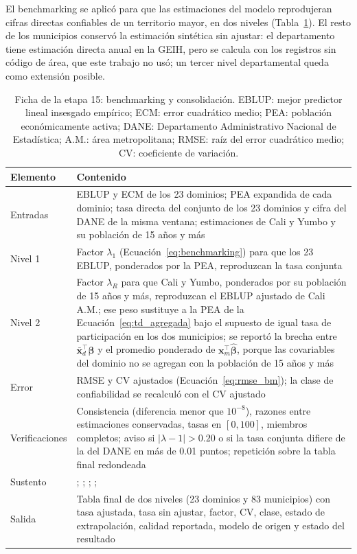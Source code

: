 El benchmarking se aplicó para que las estimaciones del modelo reprodujeran cifras directas confiables de un territorio mayor, en dos niveles (Tabla~\ref{tab:met_benchmarking}). El resto de los municipios conservó la estimación sintética sin ajustar: el departamento tiene estimación directa anual en la GEIH, pero se calcula con los registros sin código de área, que este trabajo no usó; un tercer nivel departamental queda como extensión posible.

\begin{table}[!htbp]
\centering
\small
\caption[Ficha de la etapa 15: benchmarking y consolidación]{Ficha de la etapa 15: benchmarking y consolidación. EBLUP: mejor predictor lineal insesgado empírico; ECM: error cuadrático medio; PEA: población económicamente activa; DANE: Departamento Administrativo Nacional de Estadística; A.M.: área metropolitana; RMSE: raíz del error cuadrático medio; CV: coeficiente de variación.}
\label{tab:met_benchmarking}
\renewcommand{\arraystretch}{1.15}
\begin{tabularx}{\linewidth}{>{\raggedright\arraybackslash}p{2.8cm} >{\raggedright\arraybackslash}X}
\toprule
Elemento & Contenido \\
\midrule
Entradas & EBLUP y ECM de los 23 dominios; PEA expandida de cada dominio; tasa directa del conjunto de los 23 dominios y cifra del DANE de la misma ventana; estimaciones de Cali y Yumbo y su población de 15 años y más \\
Nivel 1 & Factor $\lambda_1$ (Ecuación~\ref{eq:benchmarking}) para que los 23 EBLUP, ponderados por la PEA, reproduzcan la tasa conjunta \\
Nivel 2 & Factor $\lambda_R$ para que Cali y Yumbo, ponderados por su población de 15 años y más, reproduzcan el EBLUP ajustado de Cali A.M.; ese peso sustituye a la PEA de la Ecuación~\ref{eq:td_agregada} bajo el supuesto de igual tasa de participación en los dos municipios; se reportó la brecha entre $\bar{\mathbf{x}}_d^\top\hat{\boldsymbol{\beta}}$ y el promedio ponderado de $\mathbf{x}_m^\top\hat{\boldsymbol{\beta}}$, porque las covariables del dominio no se agregan con la población de 15 años y más \\
Error & RMSE y CV ajustados (Ecuación~\ref{eq:rmse_bm}); la clase de confiabilidad se recalculó con el CV ajustado \\
Verificaciones & Consistencia (diferencia menor que $10^{-8}$), razones entre estimaciones conservadas, tasas en $[0, 100]$, miembros completos; aviso si $|\lambda - 1| > 0.20$ o si la tasa conjunta difiere de la del DANE en más de 0.01 puntos; repetición sobre la tabla final redondeada \\
Sustento & \cite{FayHerriot1979}; \cite[pp.~24, 76]{Molina2019}; \cite[pp.~22--23]{MarinTralmaGuerrero2024}; \cite[pp.~25, 33]{DANE_SAE_2025}; \cite[p.~7]{Casen2024} \\
Salida & Tabla final de dos niveles (23 dominios y 83 municipios) con tasa ajustada, tasa sin ajustar, factor, CV, clase, estado de extrapolación, calidad reportada, modelo de origen y estado del resultado \\
\bottomrule
\end{tabularx}
\end{table}

